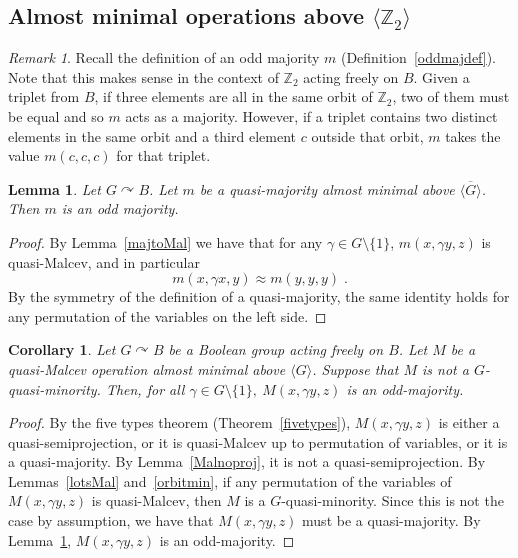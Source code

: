 \documentclass{article}
\newtheorem{corollary}[theorem]{Corollary}
\newtheorem{lemma}[theorem]{Lemma}
\theoremstyle{remark}
\newtheorem{remark}[theorem]{Remark}
\theoremstyle{definition}
\def\acts{\curvearrowright}
\begin{document}
\subsection{Almost minimal operations above \texorpdfstring{${\langle\mathbb{Z}_2\rangle}$}{Z2}}\label{sub:almostminz2}

\begin{remark} Recall the definition of an odd majority $m$ (Definition~\ref{oddmajdef}). Note that this makes sense in the context of $\mathbb{Z}_2$ acting freely on $B$. Given a triplet from $B$, if three elements are all in the same orbit of $\mathbb{Z}_2$, two of them must be equal and so $m$ acts as a majority. However, if a triplet contains two distinct elements in the same orbit and a third element $c$ outside that orbit, $m$ takes the value $m(c,c,c)$ for that triplet.
\end{remark}



\begin{lemma}\label{ood} Let $G\acts B$. Let $m$ be a quasi-majority almost minimal above $\overline{\langle G\rangle}$. Then $m$ is an odd majority.
\end{lemma}
\begin{proof}
By Lemma~\ref{majtoMal} we have that for any $\gamma\in G\setminus\{1\}$,  $m(x,\gamma y,z)$ is quasi-Malcev, and in particular \[m(x,\gamma x,y)\approx m(y,y,y)\; .
\]
By the symmetry of the definition of a  quasi-majority, the same identity holds for any permutation of the variables on the left side.
\end{proof}

\begin{corollary}\label{Maltooddmaj} Let $G\acts B$ be a Boolean group acting freely on $B$. Let $M$ be a quasi-Malcev operation almost minimal above ${\langle G\rangle}$. Suppose that $M$ is not a $G$-quasi-minority. Then, for all $\gamma\in G\setminus\{1\}, \ M(x,\gamma y, z)$ is an odd-majority. 
\end{corollary}
\begin{proof} By the five types theorem (Theorem~\ref{fivetypes}), $M(x,\gamma y, z)$ is either a quasi-semiprojection, or it is quasi-Malcev up to permutation of variables, or it is a quasi-majority. By Lemma~\ref{Malnoproj}, it is not a quasi-semiprojection. 
By Lemmas~\ref{lotsMal} and~\ref{orbitmin}, if any permutation of the variables of $M(x, \gamma y, z)$ is quasi-Malcev, then $M$ is a $G$-quasi-minority. 
Since this is not the case by assumption, we have that $M(x, \gamma y, z)$ must be a quasi-majority. By Lemma~\ref{ood}, $M(x, \gamma y, z)$ is an odd-majority.
\end{proof}
\end{document}
